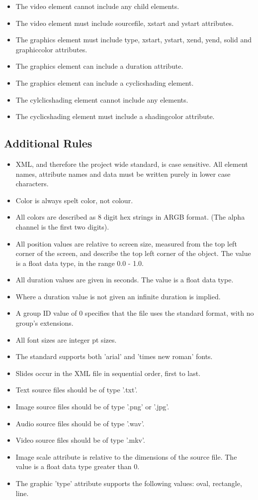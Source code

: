 \documentclass[oneside]{article}
\begin{document}
\begin{itemize}
\item The video element cannot include any child elements.
\item The video element must include sourcefile, xstart and ystart attributes.
\item The graphics element must include type, xstart, ystart, xend, yend, solid and graphiccolor attributes.
\item The graphics element can include a duration attribute.
\item The graphics element can include a cyclicshading element.
\item The cylclicshading element cannot include any elements.
\item The cyclicshading element must include a shadingcolor attribute.

\end{itemize}

\clearpage

\subsection{Additional Rules}
\begin{itemize}
\item XML, and therefore the project wide standard, is case sensitive. All element names, attribute names and data must be written purely in lower case characters.
\item Color is always spelt color, not colour.
\item All colors are described as 8 digit hex strings in ARGB format. (The alpha channel is the first two digits).
\item All position values are relative to screen size, measured from the top left corner of the screen, and describe the top left corner of the object. The value is a float data type, in the range 0.0 - 1.0.
\item All duration values are given in seconds. The value is a float data type.
\item Where a duration value is not given an infinite duration is implied.
\item A group ID value of 0 specifies that the file uses the standard format, with no group's extensions.
\item All font sizes are integer pt sizes.
\item The standard supports both 'arial' and 'times new roman' fonts.
\item Slides occur in the XML file in sequential order, first to last.
\item Text source files should be of type '.txt'.
\item Image source files should be of type '.png' or '.jpg'.
\item Audio source files should be of type '.wav'. 
\item Video source files should be of type '.mkv'.
\item Image scale attribute is relative to the dimensions of the source file. The value is a float data type greater than 0.
\item The graphic 'type' attribute supports the following values: oval, rectangle, line.
\end{itemize}
\end{document}
